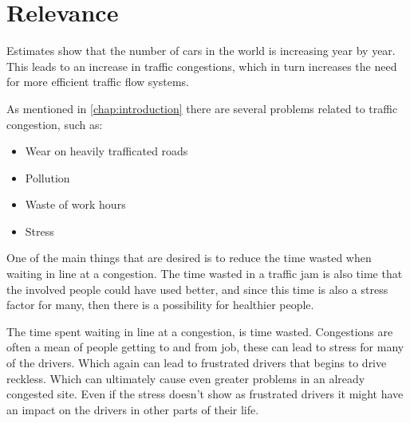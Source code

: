 \section{Relevance}
Estimates show that the number of cars in the world is increasing year by year\cite{WardsAuto:CarPopulation}. This leads to an increase in traffic congestions, which in turn increases the need for more efficient traffic flow systems.

As mentioned in \ref{chap:introduction} there are several problems related to traffic congestion, such as:
\begin{itemize}
	\item Wear on heavily trafficated roads
	\item Pollution
	\item Waste of work hours
	\item Stress
\end{itemize}

One of the main things that are desired is to reduce the time wasted when waiting in line at a congestion.
The time wasted in a traffic jam is also time that the involved people could have used better, and since this time is also a stress factor for many, then there is a possibility for healthier people.

The time spent waiting in line at a congestion, is time wasted. Congestions are often a mean of people getting to and from job, these can lead to stress for many of the drivers. Which again can lead to frustrated drivers that begins to drive reckless. Which can ultimately cause even greater problems in an already congested site. Even if the stress doesn't show as frustrated drivers it might have an impact on the drivers in other parts of their life.